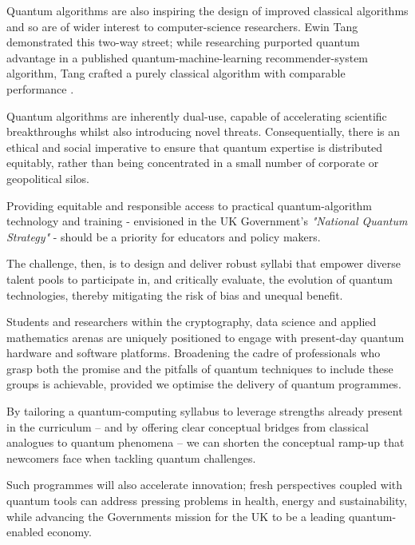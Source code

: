 Quantum algorithms are also inspiring the design of improved classical algorithms 
and so are of wider interest to computer-science researchers.  
Ewin Tang demonstrated this two-way street;
while researching purported quantum advantage in a published quantum-machine-learning recommender-system algorithm,
Tang crafted a purely classical algorithm with comparable performance \cite{Tang:2019}.

Quantum algorithms are inherently dual-use, capable of accelerating scientific breakthroughs whilst also introducing novel threats. 
Consequentially, there is an ethical and social imperative to ensure that quantum expertise is distributed equitably,
rather than being concentrated in a small number of corporate or geopolitical silos.

Providing equitable and responsible access to practical quantum-algorithm technology and training
- envisioned in the UK Government's \emph{"National Quantum Strategy"} \cite{Ukgov:NQS} -
should be a priority for educators and policy makers. 

The challenge, then, is to design and deliver robust syllabi that empower diverse talent pools to 
participate in, and critically evaluate, the evolution of quantum technologies, 
thereby mitigating the risk of bias and unequal benefit.

Students and researchers within the cryptography, data science and applied mathematics arenas 
are uniquely positioned to engage with present-day quantum hardware and software platforms.
Broadening the cadre of professionals who grasp both the promise and the pitfalls of quantum techniques to include these groups 
is achievable, provided we optimise the delivery of quantum programmes.

By tailoring a quantum-computing syllabus to leverage strengths already present in the curriculum 
-- and by offering clear conceptual bridges from classical analogues to quantum phenomena 
-- 
we can shorten the conceptual ramp-up that newcomers face when tackling quantum challenges.

Such programmes will also accelerate innovation; 
fresh perspectives coupled with quantum tools can address pressing problems in health, energy and sustainability,
while advancing the Governments mission for the UK to be a leading quantum-enabled economy\cite{Ukgov:NQS}.

